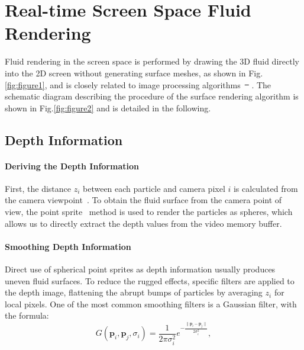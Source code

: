 \documentclass[times,twocolumn,final]{elsarticle}
\providecommand{\DIFaddtex}[1]{{\protect\color{blue}\uwave{#1}}} %
\providecommand{\DIFdeltex}[1]{{\protect\color{red}\sout{#1}}}                      %
\providecommand{\DIFaddbegin}{} %
\providecommand{\DIFaddend}{} %
\providecommand{\DIFdelbegin}{} %
\providecommand{\DIFdelend}{} %
\providecommand{\DIFadd}[1]{\texorpdfstring{\DIFaddtex{#1}}{#1}} %
\providecommand{\DIFdel}[1]{\texorpdfstring{\DIFdeltex{#1}}{}} %
\begin{document}
\section{Real-time Screen Space Fluid Rendering}
Fluid rendering in the screen space is performed by drawing the 3D fluid directly into the 2D screen without generating surface meshes, as shown in Fig.\ref{fig:figure1}, and is closely related to image processing algorithms~\DIFdelbegin \DIFdel{\mbox{%
\cite{ref:green2010screen}}\hspace{0pt}%
}\DIFdelend \DIFaddbegin \DIFadd{\mbox{%
\cite{ref:ref3}}\hspace{0pt}%
}\DIFaddend . The schematic diagram describing the procedure of the surface rendering algorithm is shown in Fig.\ref{fig:figure2} and is detailed in the following.

\subsection{Depth Information}

\paragraph{Deriving the Depth Information}
First, the distance $z_i$ between each particle and camera pixel $i$ is calculated from the camera viewpoint~\cite{ref:ref20}.
To obtain the fluid surface from the camera point of view, the point sprite~\cite{ref:ref21} method is used to render the particles as spheres, which allows us to directly extract the depth values from the video memory buffer.

\paragraph{Smoothing Depth Information}
Direct use of spherical point sprites as depth information usually produces uneven fluid surfaces. To reduce the rugged effects, specific filters are applied to the depth image, flattening the abrupt bumps of particles by averaging $z_i$ for local pixels. One of the most common smoothing filters is a Gaussian filter\cite{ref:ref24}, with the formula:
\begin{equation}
    G\left({\mathbf{p}}_i, {\mathbf{p}}_j, \sigma_i\right)
    =
    \frac{1}{2 \pi \sigma_i^{2}} e^{-\frac{ \| {\mathbf{p}}_i - {\mathbf{p}}_j \| }{2 \sigma_i^{2}}} , 
\label{con:equ2}
\end{equation}
\end{document}
